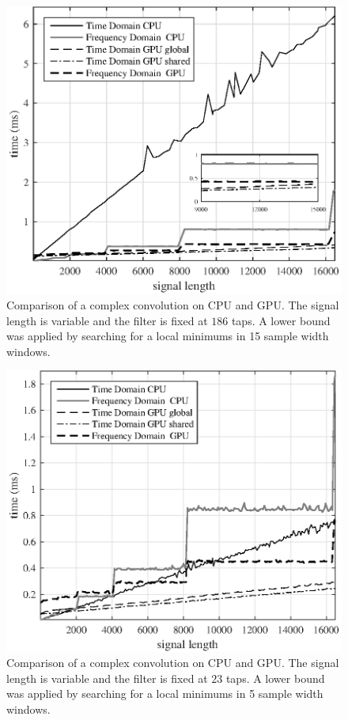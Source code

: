 \begin{figure}
	\centering\includegraphics[width=5in]{figures/gpu_intro/CPUvsGPU_1batch_186taps_varySignal.eps}
	\caption{Comparison of a complex convolution on CPU and GPU. The signal length is variable and the filter is fixed at $186$ taps. A lower bound was applied by searching for a local minimums in 15 sample width windows.}
	\label{fig:CPUvsGPU_1batch_186taps_varySignal}
\end{figure}
\begin{figure}
	\centering\includegraphics[width=5in]{figures/gpu_intro/CPUvsGPU_1batch_21taps_varySignal.eps}
	\caption{Comparison of a complex convolution on CPU and GPU. The signal length is variable and the filter is fixed at $23$ taps. A lower bound was applied by searching for a local minimums in 5 sample width windows.}
	\label{fig:CPUvsGPU_1batch_21taps_varySignal}
\end{figure}
